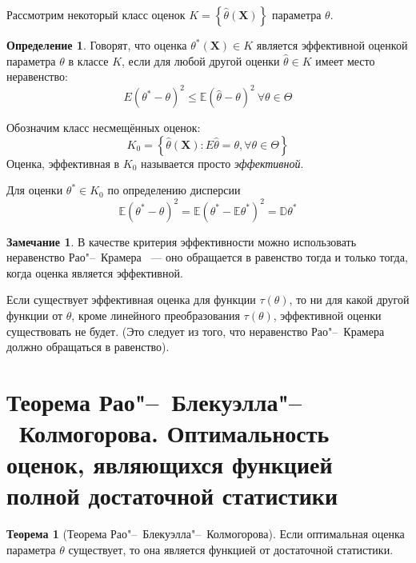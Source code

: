\documentclass[oneside,final,14pt]{extreport}
\theoremstyle{plain}
\theoremstyle{definition}
\newtheorem*{defn}{Определение}
\newtheorem*{rmrk}{Замечание}
\theoremstyle{named}
\newtheorem*{namedthm}{Теорема}
\begin{document}
Рассмотрим некоторый класс оценок $K=\left\{\hat{\theta}\left(\mathbf{X}\right)\right\}$ параметра $\theta$.
\begin{defn}
    Говорят, что оценка $\theta^{*}\left(\mathbf{X}\right) \in K$ является эффективной оценкой параметра $\theta$ в классе $K$, если для любой другой оценки $\hat{\theta} \in K$ имеет место неравенство:
    \begin{equation*}
        E\left(\theta^{*}-\theta\right)^{2} \leqslant \mathbb{E}(\hat{\theta}-\theta)^{2}~ \forall \theta \in \Theta
    \end{equation*}
\end{defn}
Обозначим класс несмещённых оценок:
\begin{equation*}
    K_{0}=\left\{\hat{\theta}\left(\mathbf{X}\right): E \hat{\theta}=\theta, \forall \theta \in \Theta\right\}
\end{equation*}
Оценка, эффективная в $K_0$ называется просто {\it эффективной}.

Для оценки $\theta^{*} \in K_{0}$ по определению дисперсии
\begin{equation*}
    \mathbb{E}\left(\theta^{*}-\theta\right)^{2}=\mathbb{E}\left(\theta^{*}-\mathbb{E} \theta^{*}\right)^{2}=\mathbb{D} \theta^{*}
\end{equation*}

\begin{rmrk}
В качестве критерия эффективности можно использовать неравенство Рао"--~Крамера ~--- оно обращается в равенство тогда и только тогда, когда оценка является эффективной.

Если существует эффективная оценка для функции $\tau(\theta)$, то ни для какой другой функции от $\theta$, кроме линейного преобразования $\tau(\theta)$, эффективной оценки существовать не будет. (Это следует из того, что неравенство Рао"--~Крамера должно обращаться в равенство).
\end{rmrk}

\section{Теорема Рао"--~Блекуэлла"--~Колмогорова. Оптимальность оценок, являющихся функцией полной достаточной статистики}

\begin{namedthm}[Теорема Рао"--~Блекуэлла"--~Колмогорова] Если оптимальная оценка параметра $\theta$ существует, то она является функцией от достаточной статистики.
\end{namedthm}
\end{document}
